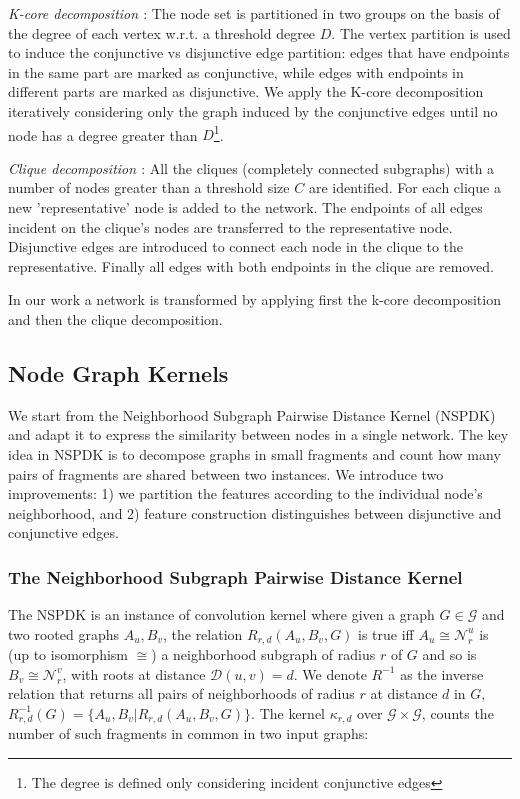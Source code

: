 \documentclass{esannV2}
\begin{document}
\textit{K-core decomposition \cite{kcore}}: The node set is partitioned in two
groups on the basis of the degree of each vertex w.r.t. a threshold degree
$D$. The vertex partition is used to induce the conjunctive vs disjunctive
edge partition: edges that have endpoints in the same part are marked as
conjunctive, while edges with endpoints in different parts are marked as
disjunctive. We apply the K-core decomposition iteratively considering only
the graph induced by the conjunctive edges until no node has a degree greater
than $D$\footnote{The degree is defined only considering incident conjunctive
edges}.

\textit{Clique decomposition \cite{clique}}:   All the cliques (completely
connected subgraphs) with a number of nodes greater than a threshold size $C$
are identified. For each clique a new 'representative' node is added to the
network. The endpoints of all edges incident on the clique's nodes are
transferred to the representative node. Disjunctive edges are introduced to
connect each node in the clique to the representative. Finally all edges with
both endpoints in the clique are removed.

In our work a network is transformed by applying first the k-core decomposition
and then the clique decomposition.

\subsection{Node Graph Kernels} 

We start from the Neighborhood Subgraph Pairwise Distance Kernel (NSPDK)
\cite{nspdk} and adapt it to express the similarity between nodes in a single
network. The key idea in NSPDK is to decompose graphs in small fragments and
count how many pairs of fragments are shared between two instances. We
introduce two improvements: 1) we partition the features according to the
individual node's neighborhood, and 2) feature construction distinguishes
between disjunctive and conjunctive edges.


\subsubsection{The Neighborhood Subgraph Pairwise Distance Kernel}

The NSPDK is an instance of convolution kernel \cite{covolution_kernel} where
given a graph $G \in \mathcal{G}$ and two rooted graphs $A_u, B_v$, the
relation $R_{r,d}(A_u, B_v, G)$ is true iff $A_u \cong \mathcal{N}_r^u$ is (up to isomorphism $\cong$) a neighborhood subgraph of radius $r$ of $G$ and so is $B_v \cong  \mathcal{N}_r^v$, with roots at distance
$\mathcal{D}(u,v)= d$. We denote $R^{-1}$ as the inverse relation that returns
all pairs of neighborhoods of radius $r$ at distance $d$ in $G$,
$R^{-1}_{r,d}(G) = \lbrace A_u, B_v | R_{r,d}(A_u,B_v,G)\rbrace$. The kernel
$\kappa_{r,d}$ over $\mathcal{G} \times \mathcal{G}$, counts the number of
such fragments in common in two input graphs: 
\end{document}

